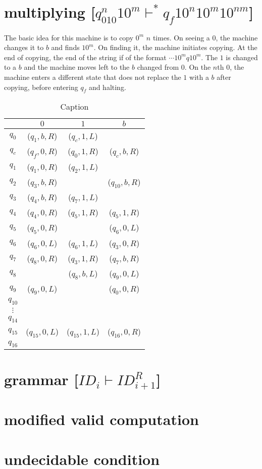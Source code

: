 \documentclass[11pt,letterpaper]{article}
\begin{document}
\section{multiplying [$q_010^n10^m \vdash^* q_f10^n10^m10^{nm}$]}
The basic idea for this machine is to copy $0^m$ $n$ times. On seeing a $0$, the machine changes it to $b$ and finds $10^m$. On finding it, the machine initiates copying. At the end of copying, the end of the string if of the format $\cdots 10^mq10^m$. The $1$ is changed to a $b$ and the machine moves left to the $b$ changed from $0$. On the $n$th $0$, the machine enters a different state that does not replace the $1$ with a $b$ after copying, before entering $q_f$ and halting.
\begin{table}[]
    \centering
    \begin{tabular}{c | c c c}
    & $0$ & $1$ & $b$ \\
    \hline
    $q_0$ & ($q_1,b,R$) & ($q_c,1,L$) & \\
    $q_c$ & ($q_f,0,R$) & ($q_0,1,R$) & ($q_c,b,R$) \\
    $q_1$ & ($q_1,0,R$) & ($q_2,1,L$) & \\
    $q_2$ & ($q_3,b,R$) & & ($q_{10},b,R$) \\
    \hline
    $q_3$ & ($q_4,b,R$) & ($q_7,1,L$) & \\
    $q_4$ & ($q_4,0,R$) & ($q_5,1,R$) & ($q_5,1,R$) \\
    $q_5$ & ($q_5,0,R$) & & ($q_6,0,L$) \\
    $q_6$ & ($q_6,0,L$) & ($q_6,1,L$) & ($q_3,0,R$) \\
    $q_7$ & ($q_8,0,R$) & ($q_3,1,R$) & ($q_7,b,R$) \\
    \hline
    $q_8$ & & ($q_8,b,L$) & ($q_9,0,L$) \\
    $q_9$ & ($q_9,0,L$) & & ($q_0,0,R$) \\
    \hline
    $q_{10}$ & \\
    $\vdots$ & \\
    $q_{14}$ & \\
    \hline
    $q_{15}$ & ($q_{15},0,L$) & ($q_{15},1,L$) & ($q_{16},0,R$) \\
    $q_{16}$ &
    \end{tabular}
    \caption{Caption}
    \label{tab:my_label}
\end{table}

\section{grammar [$ID_i \vdash ID_{i+1}^R$]}


\section{modified valid computation}


\section{undecidable condition}
\end{document}
